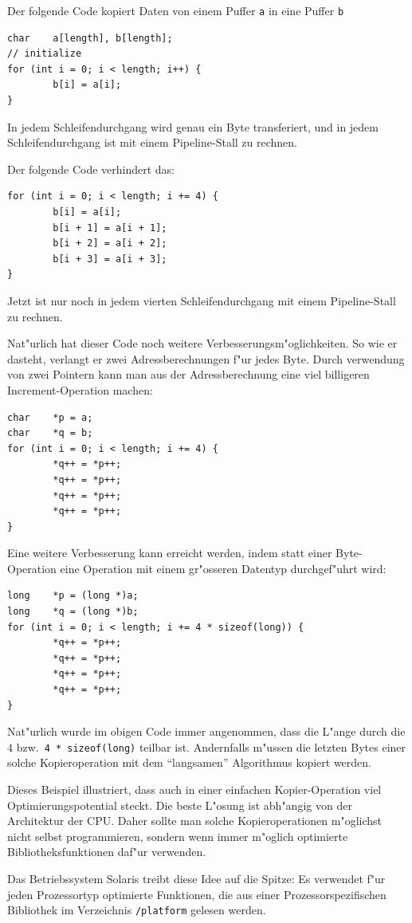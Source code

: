 \begin{beispiel}
Der folgende Code kopiert Daten von einem Puffer {\tt a} in eine Puffer {\tt b}
\begin{verbatim}
char    a[length], b[length];
// initialize
for (int i = 0; i < length; i++) {
        b[i] = a[i];
}
\end{verbatim}
In jedem Schleifendurchgang wird genau ein Byte transferiert, und in jedem
Schleifendurchgang ist mit einem Pipeline-Stall zu rechnen. 

Der folgende Code verhindert das:
\begin{verbatim}
for (int i = 0; i < length; i += 4) {
        b[i] = a[i];
        b[i + 1] = a[i + 1];
        b[i + 2] = a[i + 2];
        b[i + 3] = a[i + 3];
}
\end{verbatim}
Jetzt ist nur noch in jedem vierten Schleifendurchgang mit einem Pipeline-Stall
zu rechnen.

Nat"urlich hat dieser Code noch weitere Verbesserungsm"oglichkeiten.
So wie er dasteht, verlangt er zwei Adressberechnungen f"ur jedes Byte.
Durch verwendung von zwei Pointern kann man aus der Adressberechnung
eine viel billigeren Increment-Operation machen:
\begin{verbatim}
char    *p = a;
char    *q = b;
for (int i = 0; i < length; i += 4) {
        *q++ = *p++;
        *q++ = *p++;
        *q++ = *p++;
        *q++ = *p++;
}
\end{verbatim}
Eine weitere Verbesserung kann erreicht werden, indem statt einer
Byte-Operation eine Operation mit einem gr"osseren Datentyp durchgef"uhrt wird:
\begin{verbatim}
long    *p = (long *)a;
long    *q = (long *)b;
for (int i = 0; i < length; i += 4 * sizeof(long)) {
        *q++ = *p++;
        *q++ = *p++;
        *q++ = *p++;
        *q++ = *p++;
}
\end{verbatim}
Nat"urlich wurde im obigen Code immer angenommen, dass die L"ange durch
die $4$ bzw.~\verb+4 * sizeof(long)+ teilbar ist.
Andernfalls m"ussen die letzten Bytes einer solche Kopieroperation mit
dem ``langsamen'' Algorithmus kopiert werden.

Dieses Beispiel illustriert, dass auch in einer einfachen Kopier-Operation
viel Optimierungspotential steckt. Die beste L"osung  ist abh"angig von der
Architektur der CPU. Daher sollte man solche Kopieroperationen m"oglichst
nicht selbst programmieren, sondern wenn immer m"oglich optimierte
Bibliotheksfunktionen daf"ur verwenden.

Das Betriebssystem Solaris treibt diese Idee auf die Spitze:
Es verwendet f"ur jeden Prozessortyp optimierte
Funktionen, die aus einer Prozessorspezifischen Bibliothek
im Verzeichnis \verb+/platform+ gelesen werden.
\end{beispiel}


